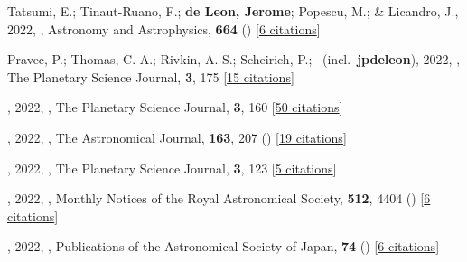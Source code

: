\item[{\color{numcolor}\scriptsize166}] Tatsumi, E.; Tinaut-Ruano, F.; \textbf{de Leon, Jerome}; Popescu, M.; \& Licandro, J., 2022, , Astronomy and Astrophysics, \textbf{664} () [\href{https://ui.adsabs.harvard.edu/abs/2022A&A...664A.107T}{6 citations}]

\item[{\color{numcolor}\scriptsize165}] Pravec, P.; Thomas, C. A.; Rivkin, A. S.; Scheirich, P.; \etal\ (incl.\ \textbf{jpdeleon}), 2022, , The Planetary Science Journal, \textbf{3}, 175 [\href{https://ui.adsabs.harvard.edu/abs/2022PSJ.....3..175P}{15 citations}]

\item[{\color{numcolor}\scriptsize164}] , 2022, , The Planetary Science Journal, \textbf{3}, 160 [\href{https://ui.adsabs.harvard.edu/abs/2022PSJ.....3..160M}{50 citations}]

\item[{\color{numcolor}\scriptsize163}] , 2022, , The Astronomical Journal, \textbf{163}, 207 () [\href{https://ui.adsabs.harvard.edu/abs/2022AJ....163..207C}{19 citations}]

\item[{\color{numcolor}\scriptsize162}] , 2022, , The Planetary Science Journal, \textbf{3}, 123 [\href{https://ui.adsabs.harvard.edu/abs/2022PSJ.....3..123R}{5 citations}]

\item[{\color{numcolor}\scriptsize161}] , 2022, , Monthly Notices of the Royal Astronomical Society, \textbf{512}, 4404 () [\href{https://ui.adsabs.harvard.edu/abs/2022MNRAS.512.4404W}{6 citations}]

\item[{\color{numcolor}\scriptsize160}] , 2022, , Publications of the Astronomical Society of Japan, \textbf{74} () [\href{https://ui.adsabs.harvard.edu/abs/2022PASJ...74L...1F}{6 citations}]

